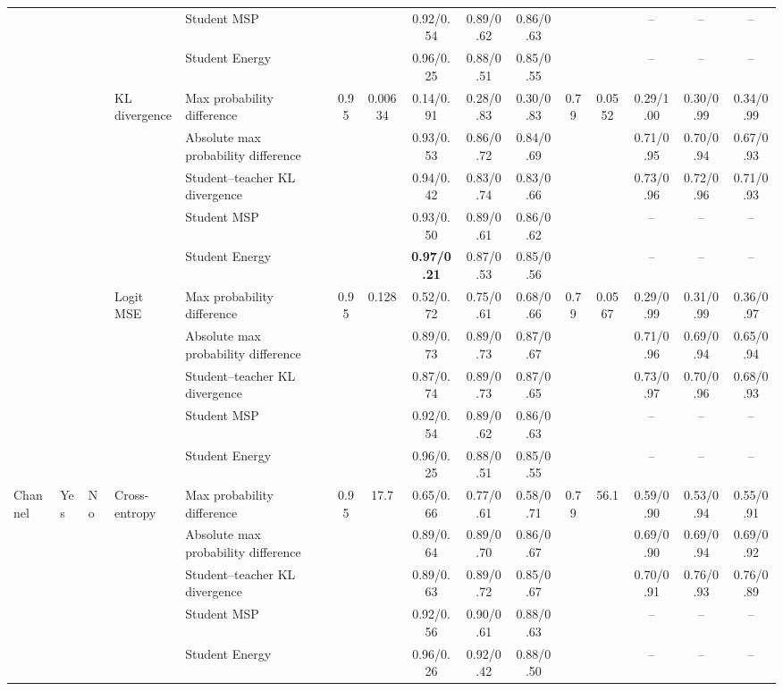 \documentclass[border=2pt]{standalone}
\begin{document}
\begin{tabular}{lllllcccccccccc}
 &  &  &  & Student MSP &  &  & 0.92/0.54 & 0.89/0.62 & 0.86/0.63 &  &  & -- & -- & -- \\
 &  &  &  & Student Energy &  &  & 0.96/0.25 & 0.88/0.51 & 0.85/0.55 &  &  & -- & -- & -- \\
 &  &  & KL divergence & Max probability difference & 0.95 & 0.00634 & 0.14/0.91 & 0.28/0.83 & 0.30/0.83 & 0.79 & 0.0552 & 0.29/1.00 & 0.30/0.99 & 0.34/0.99 \\
 &  &  &  & Absolute max probability difference &  &  & 0.93/0.53 & 0.86/0.72 & 0.84/0.69 &  &  & 0.71/0.95 & 0.70/0.94 & 0.67/0.93 \\
 &  &  &  & Student--teacher KL divergence &  &  & 0.94/0.42 & 0.83/0.74 & 0.83/0.66 &  &  & 0.73/0.96 & 0.72/0.96 & 0.71/0.93 \\
 &  &  &  & Student MSP &  &  & 0.93/0.50 & 0.89/0.61 & 0.86/0.62 &  &  & -- & -- & -- \\
 &  &  &  & Student Energy &  &  & \textbf{0.97/0.21} & 0.87/0.53 & 0.85/0.56 &  &  & -- & -- & -- \\
 &  &  & Logit MSE & Max probability difference & 0.95 & 0.128 & 0.52/0.72 & 0.75/0.61 & 0.68/0.66 & 0.79 & 0.0567 & 0.29/0.99 & 0.31/0.99 & 0.36/0.97 \\
 &  &  &  & Absolute max probability difference &  &  & 0.89/0.73 & 0.89/0.73 & 0.87/0.67 &  &  & 0.71/0.96 & 0.69/0.94 & 0.65/0.94 \\
 &  &  &  & Student--teacher KL divergence &  &  & 0.87/0.74 & 0.89/0.73 & 0.87/0.65 &  &  & 0.73/0.97 & 0.70/0.96 & 0.68/0.93 \\
 &  &  &  & Student MSP &  &  & 0.92/0.54 & 0.89/0.62 & 0.86/0.63 &  &  & -- & -- & -- \\
 &  &  &  & Student Energy &  &  & 0.96/0.25 & 0.88/0.51 & 0.85/0.55 &  &  & -- & -- & -- \\
\addlinespace
Channel & Yes & No & Cross-entropy & Max probability difference & 0.95 & 17.7 & 0.65/0.66 & 0.77/0.61 & 0.58/0.71 & 0.79 & 56.1 & 0.59/0.90 & 0.53/0.94 & 0.55/0.91 \\
 &  &  &  & Absolute max probability difference &  &  & 0.89/0.64 & 0.89/0.70 & 0.86/0.67 &  &  & 0.69/0.90 & 0.69/0.94 & 0.69/0.92 \\
 &  &  &  & Student--teacher KL divergence &  &  & 0.89/0.63 & 0.89/0.72 & 0.85/0.67 &  &  & 0.70/0.91 & 0.76/0.93 & 0.76/0.89 \\
 &  &  &  & Student MSP &  &  & 0.92/0.56 & 0.90/0.61 & 0.88/0.63 &  &  & -- & -- & -- \\
 &  &  &  & Student Energy &  &  & 0.96/0.26 & 0.92/0.42 & 0.88/0.50 &  &  & -- & -- & -- \\

\end{tabular}
\end{document}
